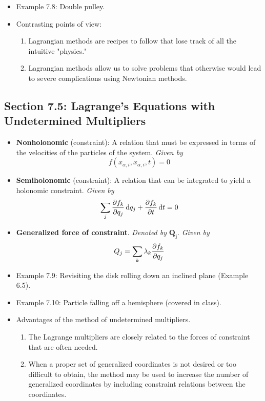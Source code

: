 \documentclass[../notes.tex]{subfiles}
\begin{document}
\begin{itemize}
\begin{itemize}
    \end{itemize}
    \item Example 7.8: Double pulley.
    \item Contrasting points of view:
    \begin{enumerate}
        \item Lagrangian methods are recipes to follow that lose track of all the intuitive "physics."
        \item Lagrangian methods allow us to solve problems that otherwise would lead to severe complications using Newtonian methods.
    \end{enumerate}
\end{itemize}


\subsection*{Section 7.5: Lagrange's Equations with Undetermined Multipliers}
\begin{itemize}
    \item \textbf{Nonholonomic} (constraint): A relation that must be expressed in terms of the velocities of the particles of the system. \emph{Given by}
    \begin{equation*}
        f(x_{\alpha,i},\dot{x}_{\alpha,i},t) = 0
    \end{equation*}
    \item \textbf{Semiholonomic} (constraint): A relation that can be integrated to yield a holonomic constraint. \emph{Given by}
    \begin{equation*}
        \sum_j\pdv{f_k}{q_j}\dd{q_j}+\pdv{f_k}{t}\dd{t} = 0
    \end{equation*}
    \item \textbf{Generalized force of constraint}. \emph{Denoted by} $\bm{Q_j}$. \emph{Given by}
    \begin{equation*}
        Q_j = \sum_k\lambda_k\pdv{f_k}{q_j}
    \end{equation*}
    \item Example 7.9: Revisiting the disk rolling down an inclined plane (Example 6.5).
    \item Example 7.10: Particle falling off a hemisphere (covered in class).
    \item Advantages of the method of undetermined multipliers.
    \begin{enumerate}
        \item The Lagrange multipliers are closely related to the forces of constraint that are often needed.
        \item When a proper set of generalized coordinates is not desired or too difficult to obtain, the method may be used to increase the number of generalized coordinates by including constraint relations between the coordinates.
    \end{enumerate}
\end{itemize}
\end{document}
